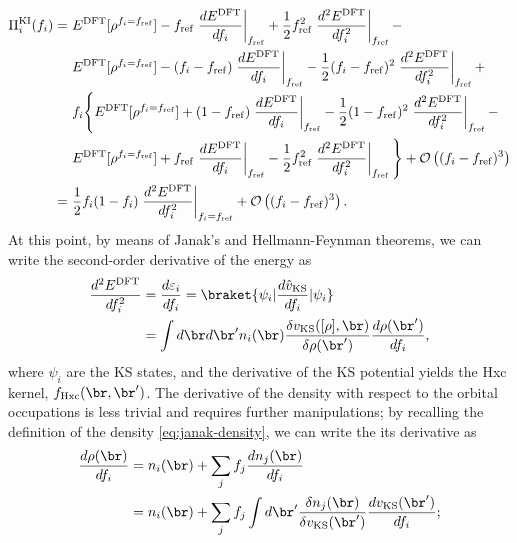 \begin{equation}
    \begin{split}
    \Pi_i^{\rm KI}(f_i) =\
    &E^{\rm DFT}[\rho^{f_i=f_{\rm ref}}] - f_{\rm ref} \left. \frac{dE^{\rm DFT}}{df_i} \right|_{f_{\rm ref}} + \frac{1}{2} f_{\rm ref}^2 \left. \frac{d^2 E^{\rm DFT}}{df_i^2} \right|_{f_{\rm ref}} - \\
    &E^{\rm DFT}[\rho^{f_i=f_{\rm ref}}] - (f_i - f_{\rm ref}) \left. \frac{dE^{\rm DFT}}{df_i} \right|_{f_{\rm ref}} - \frac{1}{2} (f_i - f_{\rm ref})^2 \left. \frac{d^2 E^{\rm DFT}}{df_i^2} \right|_{f_{\rm ref}} + \\
    &f_i \Bigg\{ E^{\rm DFT}[\rho^{f_i=f_{\rm ref}}] + (1 - f_{\rm ref}) \left. \frac{dE^{\rm DFT}}{df_i} \right|_{f_{\rm ref}} - \frac{1}{2} (1 - f_{\rm ref})^2 \left. \frac{d^2 E^{\rm DFT}}{df_i^2} \right|_{f_{\rm ref}} - \\
    &E^{\rm DFT}[\rho^{f_i=f_{\rm ref}}] + f_{\rm ref} \left. \frac{dE^{\rm DFT}}{df_i} \right|_{f_{\rm ref}} - \frac{1}{2} f_{\rm ref}^2 \left. \frac{d^2 E^{\rm DFT}}{df_i^2} \right|_{f_{\rm ref}} \Bigg\} + \mathcal{O}\left( (f_i - f_{\rm ref})^3 \right) \\
    =\ &\frac{1}{2} f_i(1-f_i) \left. \frac{d^2 E^{\rm DFT}}{df_i^2} \right|_{f_i=f_{\rm ref}} + \mathcal{O}\left( (f_i - f_{\rm ref})^3 \right) .
    \end{split}
    \label{eq:ki-correction-second-order}
\end{equation}
%
At this point, by means of Janak's and Hellmann-Feynman theorems, we can write the second-order derivative of the energy as
%
\begin{equation}
    \begin{split}
    \frac{d^2 E^{\rm DFT}}{df_i^2} &= \frac{d\varepsilon_i}{df_i} = \braket{\psi_i|\frac{d\hat{v}_{\rm KS}}{df_i}|\psi_i} \\
    &= \int d\br d\br' n_i(\br) \frac{\delta v_{\rm KS}([\rho],\br)}{\delta\rho(\br')} \frac{d\rho(\br')}{df_i} ,
    \end{split}
    \label{eq:second-derivative-energy}
\end{equation}
%
where $\psi_i$ are the KS states, and the derivative of the KS potential yields the Hxc kernel, $f_{\rm Hxc}(\br,\br')$. The derivative of the density with respect to the orbital occupations is less trivial and requires further manipulations; by recalling the definition of the density \eqref{eq:janak-density}, we can write the its derivative as
%
\begin{equation}
    \begin{split}
    \frac{d\rho(\br)}{df_i} &= n_i(\br) + \sum_j f_j \frac{dn_j(\br)}{df_i} \\
    &= n_i(\br) + \sum_j f_j \int d\br' \frac{\delta n_j(\br)}{\delta v_{\rm KS}(\br')} \frac{dv_{\rm KS}(\br')}{df_i} ;
    \end{split}
    \label{eq:density-derivative-1}
\end{equation}
